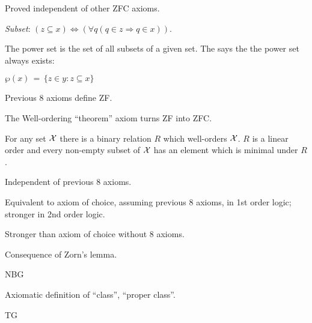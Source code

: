  Proved independent of other \textsf{ZFC} axioms.
 
 
\label{sec:Axiom-of-power-set}

\textsl{Subset}:
$(z\subseteq x)
 \Leftrightarrow 
 (\forall q(q\in z\Rightarrow q\in x)).$
 
The power set is the set of all subsets of a given set.
The  says the the power set
always exists\cite{wiki:AxiomOfPowerSet}:

${\displaystyle \wp(x) \,=\, \{z\in y:z\subseteq x\}}$

\label{sec:Well_ordering_theorem}

Previous 8 axioms define \textsf{ZF}.

The Well-ordering ``theorem'' axiom turns \textsf{ZF}
into \textsf{ZFC}\cite{wiki:WellOrderingTheorem}.

For any set $\mathcal{X}$ there is a binary relation $R$ which
 well-orders $\mathcal{X}$.
 $R$ is a linear order and every non-empty subset of $\mathcal{X}$
 has an element which is minimal under $R$.

Independent of previous 8 axioms.

Equivalent to axiom of choice\cite{wiki:AxiomOfChoice}, 
assuming previous 8 axioms, in 1st order logic;
stronger in 2nd order logic.

Stronger than axiom of choice without 8 axioms.

Consequence of Zorn's lemma\cite{wiki:ZornsLemma}.

\label{vonNeumann-Bernays-Godel_set_theory}
\textsf{NBG}\cite{wiki:NBGSetTheory}

Axiomatic definition of ``class'', ``proper class''.

\textsf{TG}



